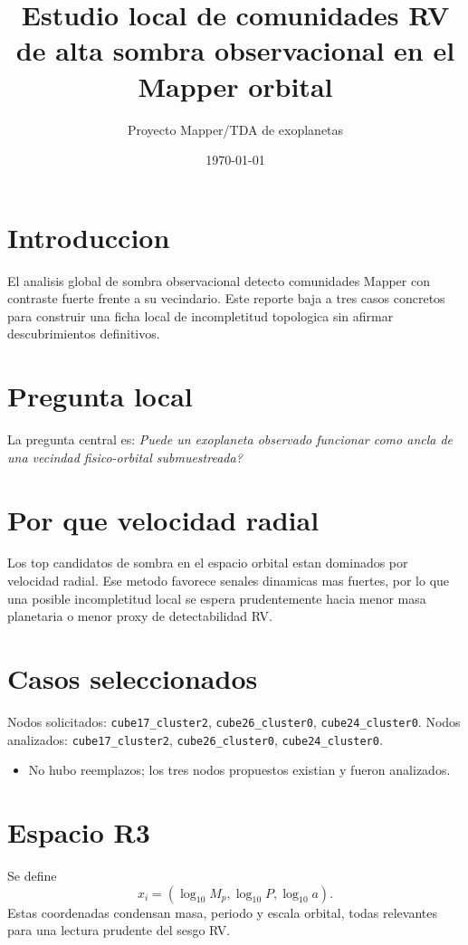 \documentclass[11pt]{article}
\title{Estudio local de comunidades RV de alta sombra observacional en el Mapper orbital}
\author{Proyecto Mapper/TDA de exoplanetas}
\date{\today}
\begin{document}
\maketitle

\section{Introduccion}
El analisis global de sombra observacional detecto comunidades Mapper con contraste fuerte frente a su vecindario. Este reporte baja a tres casos concretos para construir una ficha local de incompletitud topologica sin afirmar descubrimientos definitivos.

\section{Pregunta local}
La pregunta central es: \emph{Puede un exoplaneta observado funcionar como ancla de una vecindad fisico-orbital submuestreada?}

\section{Por que velocidad radial}
Los top candidatos de sombra en el espacio orbital estan dominados por velocidad radial. Ese metodo favorece senales dinamicas mas fuertes, por lo que una posible incompletitud local se espera prudentemente hacia menor masa planetaria o menor proxy de detectabilidad RV.

\section{Casos seleccionados}
Nodos solicitados: \texttt{cube17_cluster2}, \texttt{cube26_cluster0}, \texttt{cube24_cluster0}. Nodos analizados: \texttt{cube17_cluster2}, \texttt{cube26_cluster0}, \texttt{cube24_cluster0}.
\begin{itemize}
\item No hubo reemplazos; los tres nodos propuestos existian y fueron analizados.
\end{itemize}

\section{Espacio R3}
Se define
\[
x_i = (\log_{10} M_p,\log_{10} P,\log_{10} a).
\]
Estas coordenadas condensan masa, periodo y escala orbital, todas relevantes para una lectura prudente del sesgo RV.
\end{document}
